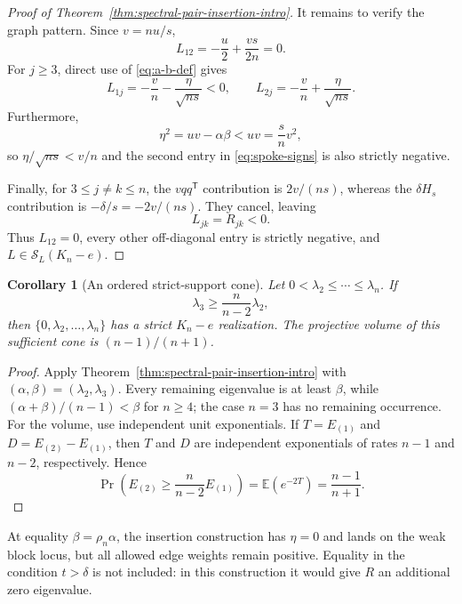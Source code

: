 \documentclass[11pt,reqno]{amsart}
\newtheorem{corollary}[theorem]{Corollary}
\theoremstyle{definition}
\theoremstyle{remark}
\newcommand{\SL}{\mathcal S_L}
\begin{document}
\begin{proof}[Proof of Theorem~\ref{thm:spectral-pair-insertion-intro}]
It remains to verify the graph pattern.  Since $v=nu/s$,
\[
  L_{12}=-\frac u2+\frac{vs}{2n}=0.
\]
For $j\ge3$, direct use of \eqref{eq:a-b-def} gives
\begin{equation}\label{eq:spoke-signs}
  L_{1j}=-\frac vn-\frac{\eta}{\sqrt{ns}}<0,
  \qquad
  L_{2j}=-\frac vn+\frac{\eta}{\sqrt{ns}}.
\end{equation}
Furthermore,
\[
  \eta^2=uv-\alpha\beta<uv=\frac{s}{n}v^2,
\]
so $\eta/\sqrt{ns}<v/n$ and the second entry in
\eqref{eq:spoke-signs} is also strictly negative.

Finally, for $3\le j\ne k\le n$, the $vqq^{\mathsf T}$ contribution is
$2v/(ns)$, whereas the $\delta H_s$ contribution is
$-\delta/s=-2v/(ns)$.  They cancel, leaving
\[
  L_{jk}=R_{jk}<0.
\]
Thus $L_{12}=0$, every other off-diagonal entry is strictly negative, and
$L\in\SL(K_n-e)$.
\end{proof}

\begin{corollary}[An ordered strict-support cone]\label{cor:ordered-cone}
Let $0<\lambda_2\le\cdots\le\lambda_n$.  If
\begin{equation}\label{eq:intro-cone}
  \lambda_3\ge\frac{n}{n-2}\lambda_2,
\end{equation}
then $\{0,\lambda_2,\ldots,\lambda_n\}$ has a strict $K_n-e$
realization.  The projective volume of this sufficient cone is
$(n-1)/(n+1)$.
\end{corollary}

\begin{proof}
Apply Theorem~\ref{thm:spectral-pair-insertion-intro} with
$(\alpha,\beta)=(\lambda_2,\lambda_3)$.  Every remaining eigenvalue is at
least $\beta$, while $(\alpha+\beta)/(n-1)<\beta$ for $n\ge4$; the case
$n=3$ has no remaining occurrence.  For the volume, use independent unit
exponentials.  If $T=E_{(1)}$ and $D=E_{(2)}-E_{(1)}$, then $T$ and $D$ are
independent exponentials of rates $n-1$ and $n-2$, respectively.  Hence
\[
  \Pr\left(E_{(2)}\ge\frac{n}{n-2}E_{(1)}\right)
  =\mathbb E(e^{-2T})=\frac{n-1}{n+1}.
\]
\end{proof}

At equality $\beta=\rho_n\alpha$, the insertion construction has $\eta=0$
and lands on the weak block locus, but all allowed edge weights remain
positive.  Equality in the condition $t>\delta$ is not included: in this
construction it would give $R$ an additional zero eigenvalue.
\end{document}

